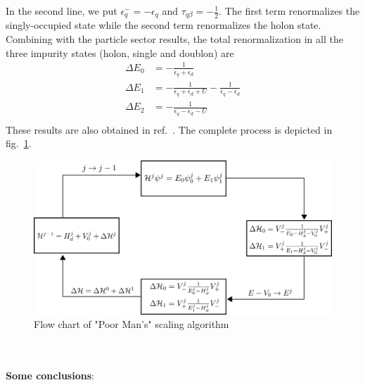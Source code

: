 \documentclass[twoside]{report}
\numberwithin{equation}{section}
\begin{document}
In the second line, we put \(\epsilon^-_q = -\epsilon_q\) and \(\tau_{q\beta} = -\frac{1}{2}\). The first term renormalizes the singly-occupied state while the second term renormalizes the holon state. Combining with the particle sector results, the total renormalization in all the three impurity states (holon, single and doublon) are
\begin{equation}\begin{aligned}
\Delta E_0 &= -\frac{1}{\epsilon_q + \epsilon_d}\\
\Delta E_1 &= -\frac{1}{\epsilon_q + \epsilon_d + U} - \frac{1}{\epsilon_q - \epsilon_d}\\
\Delta E_2 &= -\frac{1}{\epsilon_q - \epsilon_d - U}\\
\end{aligned}\end{equation}
These results are also obtained in ref.~\cite{hewson}. The complete process is depicted in fig.~\ref{pmsflow}.
\begin{figure}
    \centering
    \includegraphics[scale=0.34]{pms-flowchart.png}
    \caption{Flow chart of "Poor Man's" scaling algorithm}
    \label{pmsflow}
\end{figure}
\\\\\textbf{Some conclusions}:
\end{document}
